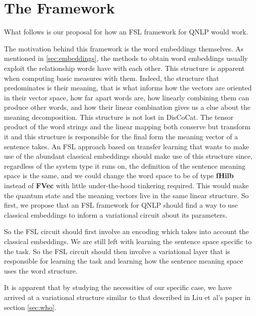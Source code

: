 \chapter{The Framework} \label{chap:framework}
What follows is our proposal for how an FSL framework for QNLP would work.

The motivation behind this framework is the word embeddings themselves. As mentioned in \ref{sec:embeddings}, the methods to obtain word embeddings usually exploit the relationship words have with each other. This structure is apparent when computing basic measures with them. Indeed, the structure that predominates is their meaning, that is what informs how the vectors are oriented in their vector space, how far apart words are, how linearly combining them can produce other words, and how their linear combination gives us a clue about the meaning decomposition. This structure is not lost in DisCoCat. The tensor product of the word strings and the linear mapping both conserve but transform it and this structure is responsible for the final form the meaning vector of a sentence takes. An FSL approach based on transfer learning that wants to make use of the abundant classical embeddings should make use of this structure since, regardless of the system type it runs on, the definition of the sentence meaning space is the same, and we could change the word space to be of type \textbf{fHilb} instead of \textbf{FVec} with little under-the-hood tinkering required. This would make the quantum state and the meaning vectors live in the same linear structure. So first, we propose that an FSL framework for QNLP should find a way to use classical embeddings to inform a variational circuit about its parameters.

So the FSL circuit should first involve an encoding which takes into account the classical embeddings. We are still left with learning the sentence space specific to the task. So the FSL circuit should then involve a variational layer that is responsible for learning the task and learning how the sentence meaning space uses the word structure.

It is apparent that by studying the necessities of our specific case, we have arrived at a variational structure similar to that described in Liu et al's paper in section \ref{sec:who}.

